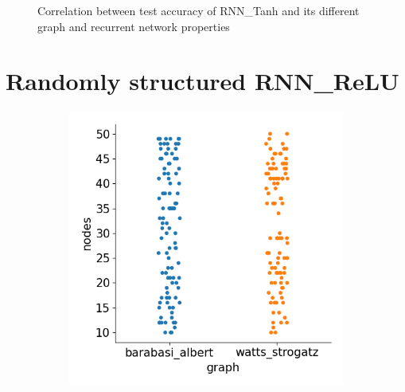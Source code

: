 \begin{figure}[H]
\caption[Correlation between test accuracy of RNN\_Tanh and its different graph and recurrent network properties - 1]{Correlation between test accuracy of RNN\_Tanh and its different graph and recurrent network properties} \label{fig:tanh_correlation}
\end{figure}

\newpage
\section{Randomly structured RNN\_ReLU}\label{app:rs_relu}

\begin{figure}[H]
    \centering
    \begin{subfigure}{0.45\textwidth}
        \includegraphics[width=\linewidth]{images/results/random/relu/graph_nodes.png}
        \caption{} \label{fig:relu_graph_nodes}
    \end{subfigure}%
    \hfill
    \begin{subfigure}{0.45\textwidth}

\end{subfigure}
\end{figure}
